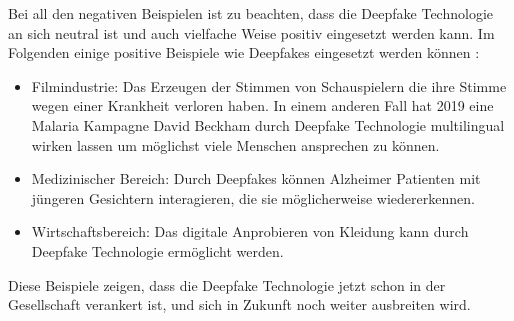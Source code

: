 Bei all den negativen Beispielen ist zu beachten, dass die Deepfake Technologie an sich neutral ist und auch vielfache Weise positiv eingesetzt werden kann. Im Folgenden einige positive Beispiele wie Deepfakes eingesetzt werden können \autocite{westerlundEmergenceDeepfakeTechnology2019}:
\begin{itemize}
    \item Filmindustrie: Das Erzeugen der Stimmen von Schauspielern die ihre Stimme wegen einer Krankheit verloren haben. 
        In einem anderen Fall hat 2019 eine Malaria Kampagne David Beckham durch Deepfake Technologie multilingual wirken lassen um möglichst viele Menschen ansprechen zu können.
    \item Medizinischer Bereich: Durch Deepfakes können Alzheimer Patienten mit jüngeren Gesichtern interagieren, die sie möglicherweise wiedererkennen. 
    \item Wirtschaftsbereich: Das digitale Anprobieren von Kleidung kann durch Deepfake Technologie ermöglicht werden.
\end{itemize}
Diese Beispiele zeigen, dass die Deepfake Technologie jetzt schon in der Gesellschaft verankert ist, und sich in Zukunft noch weiter ausbreiten wird.

